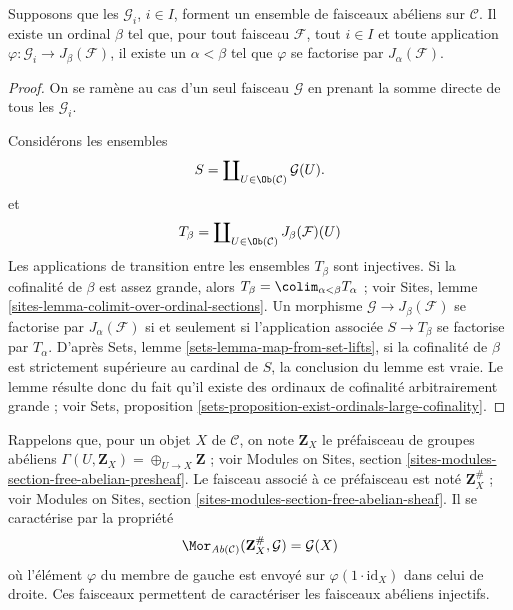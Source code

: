 \begin{lemma}
\label{lemma-map-into-smaller}
Supposons que les $\mathcal{G}_i$, $i\in I$, forment un ensemble de faisceaux
abéliens sur $\mathcal{C}$. Il existe un ordinal $\beta$ tel que, pour tout
faisceau $\mathcal{F}$, tout $i\in I$ et toute application
$\varphi : \mathcal{G}_i \to J_\beta(\mathcal{F})$, il existe un
$\alpha < \beta$ tel que $ \varphi $ se factorise par
$J_\alpha(\mathcal{F})$.
\end{lemma}

\begin{proof}
On se ramène au cas d'un seul faisceau $\mathcal{G}$ en prenant la somme
directe de tous les $\mathcal{G}_i$.

\medskip\noindent
Considérons les ensembles
$$
S = \coprod\nolimits_{U \in \Ob(\mathcal{C})} \mathcal{G}(U).
$$
et
$$
T_\beta
=
\coprod\nolimits_{U \in \Ob(\mathcal{C})} J_\beta(\mathcal{F})(U)
$$
Les applications de transition entre les ensembles $T_\beta$ sont injectives.
Si la cofinalité de $\beta$ est assez grande, alors
$T_\beta = \colim_{\alpha < \beta} T_\alpha$ ; voir
Sites, lemme \ref{sites-lemma-colimit-over-ordinal-sections}. Un morphisme
$\mathcal{G} \to J_\beta(\mathcal{F})$ se factorise par
$J_\alpha(\mathcal{F})$ si et seulement si l'application associée
$S \to T_\beta$ se factorise par $T_\alpha$. D'après
Sets, lemme \ref{sets-lemma-map-from-set-lifts}, si la cofinalité de $\beta$
est strictement supérieure au cardinal de $S$, la conclusion du lemme est
vraie. Le lemme résulte donc du fait qu'il existe des ordinaux de cofinalité
arbitrairement grande ; voir
Sets, proposition \ref{sets-proposition-exist-ordinals-large-cofinality}.
\end{proof}

\noindent
Rappelons que, pour un objet $X$ de $\mathcal{C}$, on note $\mathbf{Z}_X$ le
préfaisceau de groupes abéliens $\Gamma(U, \mathbf{Z}_X) =
\oplus_{U \to X} \mathbf{Z}$ ; voir
Modules on Sites, section \ref{sites-modules-section-free-abelian-presheaf}.
Le faisceau associé à ce préfaisceau est noté $\mathbf{Z}_X^\#$ ; voir
Modules on Sites, section \ref{sites-modules-section-free-abelian-sheaf}.
Il se caractérise par la propriété
\begin{equation}
\label{equation-free-sheaf-on}
\Mor_{\textit{Ab}(\mathcal{C})}(\mathbf{Z}_X^\#, \mathcal{G})
=
\mathcal{G}(X)
\end{equation}
où l'élément $\varphi$ du membre de gauche est envoyé sur
$\varphi(1 \cdot \text{id}_X)$ dans celui de droite. Ces faisceaux permettent
de caractériser les faisceaux abéliens injectifs.

